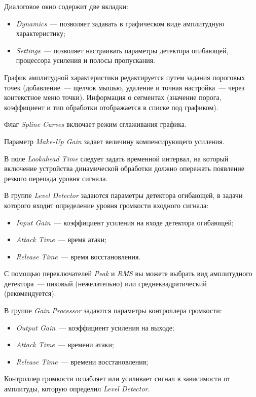 \documentclass[oneside, final, 14pt]{extreport}
\begin{document}
Диалоговое окно содержит две вкладки:
\begin{itemize}
  \item \emph{Dynamics}~--- позволяет задавать в графическом виде амплитудную характеристику;
  \item \emph{Settings}~--- позволяет настраивать параметры детектора огибающей, процессора усиления и полосы пропускания.
\end{itemize}
	
График амплитудной характеристики редактируется путем задания пороговых точек (добавление~--- щелчок мышью, удаление и точная настройка~--- через контекстное меню точки). Информация о сегментах (значение порога, коэффициент и тип обработки отображается в списке под графиком).

Флаг \emph{Spline Curves} включает режим сглаживания графика.

Параметр \emph{Make-Up Gain} задает величину компенсирующего усиления.

В поле \emph{Lookahead Time} следует задать временной интервал, на который включение устройства динамической обработки должно опережать появление резкого перепада уровня сигнала.

В группе \emph{Level Detector} задаются параметры детектора огибающей, в задачи которого входит определение уровня громкости входного сигнала:
\begin{itemize}
  \item \emph{Input Gain}~--- коэффициент усиления на входе детектора огибающей;
  \item \emph{Attack Time}~--- время атаки;
  \item \emph{Release Time}~--- время восстановления.
\end{itemize}

С помощью переключателей \emph{Peak} и \emph{RMS} вы можете выбрать вид амплитудного детектора~--- пиковый (нежелательно) или среднеквадратический (рекомендуется).

В группе \emph{Gain Processor} задаются параметры контроллера громкости:
\begin{itemize}
  \item \emph{Output Gain}~--- коэффициент усиления на выходе;
  \item \emph{Attack Time}~--- времени атаки;
  \item \emph{Release Time}~--- времени восстановления;
\end{itemize}

Контроллер громкости ослабляет или усиливает сигнал в зависимости от амплитуды, которую определил \emph{Level Detector}.
\end{document}
